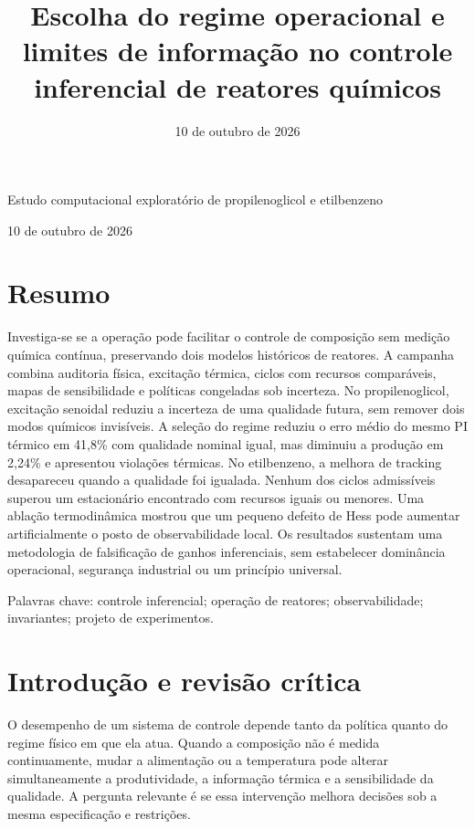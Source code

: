 \documentclass[
  11pt,
  letterpaper,
]{article}
\title{Escolha do regime operacional e limites de informação no controle
inferencial de reatores químicos}
\author{}
\date{10 de outubro de 2026}
\begin{document}
\maketitle

Estudo computacional exploratório de propilenoglicol e etilbenzeno

10 de outubro de 2026

\hypertarget{resumo}{%
\section{Resumo}\label{resumo}}

Investiga-se se a operação pode facilitar o controle de composição sem
medição química contínua, preservando dois modelos históricos de
reatores. A campanha combina auditoria física, excitação térmica, ciclos
com recursos comparáveis, mapas de sensibilidade e políticas congeladas
sob incerteza. No propilenoglicol, excitação senoidal reduziu a
incerteza de uma qualidade futura, sem remover dois modos químicos
invisíveis. A seleção do regime reduziu o erro médio do mesmo PI térmico
em 41,8\% com qualidade nominal igual, mas diminuiu a produção em 2,24\%
e apresentou violações térmicas. No etilbenzeno, a melhora de tracking
desapareceu quando a qualidade foi igualada. Nenhum dos ciclos
admissíveis superou um estacionário encontrado com recursos iguais ou
menores. Uma ablação termodinâmica mostrou que um pequeno defeito de
Hess pode aumentar artificialmente o posto de observabilidade local. Os
resultados sustentam uma metodologia de falsificação de ganhos
inferenciais, sem estabelecer dominância operacional, segurança
industrial ou um princípio universal.

Palavras chave: controle inferencial; operação de reatores;
observabilidade; invariantes; projeto de experimentos.

\hypertarget{introduuxe7uxe3o-e-revisuxe3o-cruxedtica}{%
\section{Introdução e revisão
crítica}\label{introduuxe7uxe3o-e-revisuxe3o-cruxedtica}}

O desempenho de um sistema de controle depende tanto da política quanto
do regime físico em que ela atua. Quando a composição não é medida
continuamente, mudar a alimentação ou a temperatura pode alterar
simultaneamente a produtividade, a informação térmica e a sensibilidade
da qualidade. A pergunta relevante é se essa intervenção melhora
decisões sob a mesma especificação e restrições.
\end{document}
